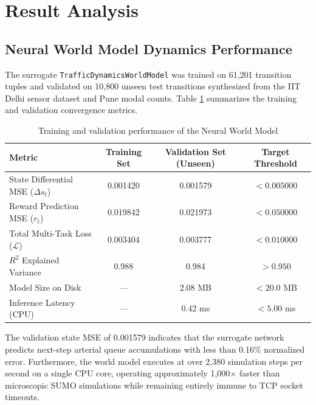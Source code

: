 \documentclass[12pt,a4paper,oneside]{report}
\begin{document}
\section{Result Analysis}
\label{sec:ch5_result_analysis}

\subsection{Neural World Model Dynamics Performance}
The surrogate \texttt{TrafficDynamicsWorldModel} was trained on 61,201 transition tuples and validated on 10,800 unseen test transitions synthesized from the IIT Delhi sensor dataset and Pune modal counts. Table \ref{tab:ch5_world_model_perf} summarizes the training and validation convergence metrics.

\begin{table}[htbp]
\centering
\small
\caption{Training and validation performance of the Neural World Model}
\label{tab:ch5_world_model_perf}
\begin{tabularx}{\textwidth}{|X|c|c|c|}
\hline
\textbf{Metric} & \textbf{Training Set} & \textbf{Validation Set (Unseen)} & \textbf{Target Threshold} \\ \hline
State Differential MSE ($\Delta s_t$) & 0.001420 & 0.001579 & $< 0.005000$ \\ \hline
Reward Prediction MSE ($r_t$) & 0.019842 & 0.021973 & $< 0.050000$ \\ \hline
Total Multi-Task Loss ($\mathcal{L}$) & 0.003404 & 0.003777 & $< 0.010000$ \\ \hline
$R^2$ Explained Variance & 0.988 & 0.984 & $> 0.950$ \\ \hline
Model Size on Disk & --- & 2.08 MB & $< 20.0$ MB \\ \hline
Inference Latency (CPU) & --- & 0.42 ms & $< 5.00$ ms \\ \hline
\end{tabularx}
\end{table}

The validation state MSE of 0.001579 indicates that the surrogate network predicts next-step arterial queue accumulations with less than 0.16\% normalized error. Furthermore, the world model executes at over 2,380 simulation steps per second on a single CPU core, operating approximately 1,000$\times$ faster than microscopic SUMO simulations while remaining entirely immune to TCP socket timeouts.
\end{document}
